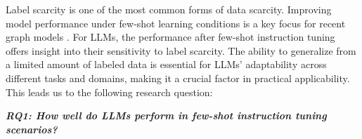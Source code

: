 Label scarcity is one of the most common forms of data scarcity. Improving model performance under few-shot learning conditions is a key focus for recent graph models \cite{yu2024survey, zhao2024pre}. For LLMs, the performance after few-shot instruction tuning offers insight into their sensitivity to label scarcity. The ability to generalize from a limited amount of labeled data is essential for LLMs’ adaptability across different tasks and domains, making it a crucial factor in practical applicability. This leads us to the following research question:




\vspace{0.5\baselineskip}
\begin{mdframed}[backgroundcolor=gray!8]
\textbf{\textit{RQ1: How well do LLMs perform in few-shot instruction tuning scenarios?}}
\end{mdframed}
\vspace{0.5\baselineskip}




